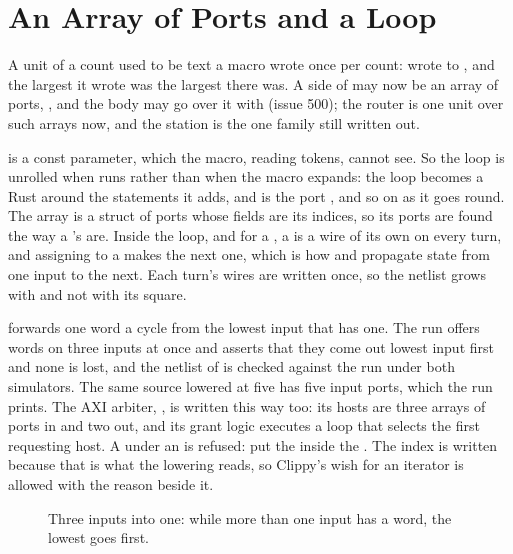 \section{An Array of Ports and a Loop}
\label{sec:x-loop}

A unit of a count used to be text a macro wrote once per count:
 wrote  to , and the
largest it wrote was the largest there was. A side of  may
now be an array of ports, , and the body may
go over it with  (issue 500); the router is one
unit over such arrays now, and the station is the one family still
written out.

 is a const parameter, which the macro, reading tokens, cannot
see. So the loop is unrolled when  runs rather than when
the macro expands: the loop becomes a Rust  around the
statements it adds, and  is the port ,
 and so on as it goes round. The array is a struct of
ports whose fields are its indices, so its ports are found the way a
's are. Inside the loop, and for a , a
 is a wire of its own on every turn, and assigning to a
 makes the next one, which is how  and
 propagate state from one input to the next.
Each turn's wires are written once, so the netlist grows with 
and not with its square.

 forwards one word a cycle from the lowest input that
has one. The run offers words on three inputs at once and asserts that
they come out lowest input first and none is lost, and the netlist of
 is checked against the run under both simulators. The
same source lowered at five has five input ports, which the run
prints. The AXI arbiter, , is written this
way too: its hosts are three arrays of ports in and two out, and its
grant logic executes a loop that selects the first requesting host. A
 under an  is refused: put the 
inside the . The index is written  because that
is what the lowering reads, so Clippy's wish for an iterator is
allowed with the reason beside it.

\begin{figure}[htbp]
\centering

\caption{Three inputs into one: while more than one input has a word,
the lowest goes first.}
\label{fig:x-loop}
\end{figure}




